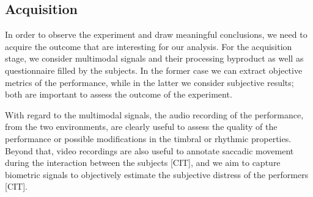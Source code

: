 \subsection{Acquisition}
In order to observe the experiment and draw meaningful conclusions, we need to acquire the outcome that are interesting for our analysis. For the acquisition stage, we consider multimodal signals and their processing byproduct as well as questionnaire filled by the subjects. In the former case we can extract objective metrics of the performance, while in the latter we consider subjective results; both are important to assess the outcome of the experiment. 

With regard to the multimodal signals, the audio recording of the performance, from the two environments, are clearly useful to assess the quality of the performance or possible modifications in the timbral or rhythmic properties. Beyond that, video recordings are also useful to annotate saccadic movement during the interaction between the subjects [CIT], and we aim to capture biometric signals to objectively estimate the subjective distress of the performers [CIT]. 
